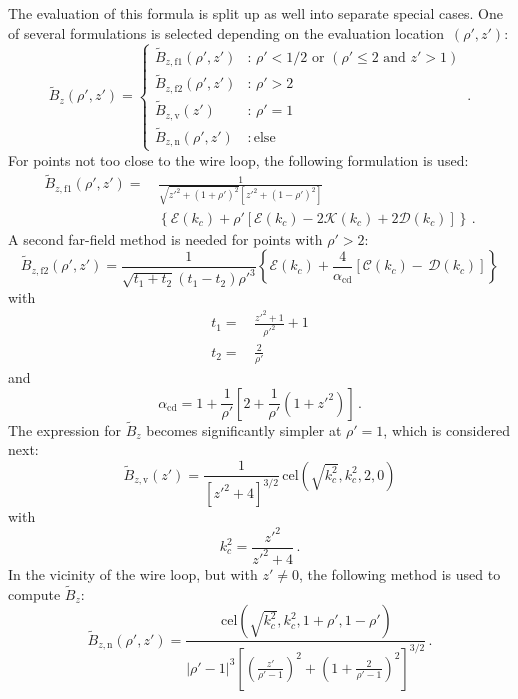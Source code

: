 The evaluation of this formula is split up as well into separate special cases.
One of several formulations is selected depending on the evaluation location~$(\rho', z')$:
\begin{equation}
  \tilde{B}_z(\rho', z')
  = \begin{cases}
      \tilde{B}_{z,\mathrm{f1}} (\rho', z') &:\, \rho' < 1/2 \textrm{ or } (\rho' \leq 2 \textrm{ and } z' > 1) \\
      \tilde{B}_{z,\mathrm{f2}} (\rho', z') &:\, \rho' > 2 \\
      \tilde{B}_{z,\mathrm{v}} (z') &:\, \rho' = 1 \\
      \tilde{B}_{z,\mathrm{n}} (\rho', z') &:\, \textrm{else}
    \end{cases} \, .
\end{equation}
For points not too close to the wire loop, the following formulation is used:
\begin{align}
  \tilde{B}_{z,\mathrm{f1}} (\rho', z')
  =&\, \frac{1}{\sqrt{{z'}^2 + (1+\rho')^2} \left[{z'}^2 + (1 - \rho')^2 \right] } \nonumber \\
  ~&\,  \left\{ \mathcal{E}(k_c) + \rho' \left[ \mathcal{E}(k_c) - 2 \mathcal{K}(k_c) + 2 \mathcal{D}(k_c) \right] \right\} \, . \label{eqn:cwl_B_z_f1}
\end{align}
A second far-field method is needed for points with $\rho' > 2$:
\begin{equation}
  \tilde{B}_{z,\mathrm{f2}} (\rho', z')
  = \frac{1}{\sqrt{t_1 + t_2}(t_1-t_2) {\rho'}^3}
    \left\{ \mathcal{E}(k_c) + \frac{4}{\alpha_\mathrm{cd}} \left[ \mathcal{C}(k_c) - \,\mathcal{D}(k_c) \right] \right\} \label{eqn:cwl_B_z_f2}
\end{equation}
with
\begin{align}
  t_1 =&\, \frac{z'^2 + 1}{\rho'^2} + 1 \\
  t_2 =&\, \frac{2}{\rho'}
\end{align}
and
\begin{equation}
  \alpha_\mathrm{cd} = 1 + \frac{1}{\rho'} \left[ 2 + \frac{1}{\rho'} \left( 1 + {z'}^2 \right) \right] \, .
\end{equation}
The expression for $\tilde{B}_z$ becomes significantly simpler at $\rho'=1$,
which is considered next:
\begin{equation}
  \tilde{B}_{z,\mathrm{v}} (z')
  = \frac{1}{\left[ {z'}^2 + 4 \right]^{3/2}} \,\mathrm{cel}\left(\sqrt{k_c^2}, k_c^2, 2, 0 \right) \label{eqn:cwl_B_z_v}
\end{equation}
with
\begin{equation}
  k_c^2 = \frac{{z'}^2}{{z'}^2 + 4} \, .
\end{equation}
In the vicinity of the wire loop, but with $z' \neq 0$,
the following method is used to compute $\tilde{B}_z$:
\begin{equation}
  \tilde{B}_{z,\mathrm{n}} (\rho', z')
  = \frac{\,\mathrm{cel}\left( \sqrt{k_c^2}, k_c^2, 1 + \rho', 1 - \rho' \right) }
         {\left|\rho' - 1 \right|^3 \left[ \left( \frac{z'}{\rho'-1} \right)^2 + \left(1 + \frac{2}{\rho'-1} \right)^2 \right]^{3/2} } \, . \label{eqn:cwl_B_z_n}
\end{equation}

